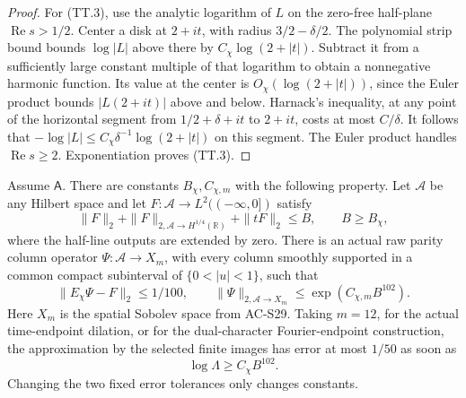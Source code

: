 \begin{proof}
For (TT.3), use the analytic logarithm of \(L\) on the
zero-free half-plane \(\operatorname{Re}s>1/2\).
Center a disk at \(2+it\), with radius
\(3/2-\delta/2\).
The polynomial strip bound bounds \(\log|L|\) above
there by \(C_\chi\log(2+|t|)\).
Subtract it from a sufficiently large constant multiple
of that logarithm to obtain a nonnegative harmonic
function.  Its value at the center is
\(O_\chi(\log(2+|t|))\), since the Euler product bounds
\(|L(2+it)|\) above and below.
Harnack's inequality, at any point of the horizontal
segment from \(1/2+\delta+it\) to \(2+it\), costs at
most \(C/\delta\).
It follows that
\(-\log|L|\leq C_\chi\delta^{-1}\log(2+|t|)\)
on this segment.  The Euler product handles
\(\operatorname{Re}s\geq2\).
Exponentiation proves (TT.3).
\end{proof}

\begin{lemma}
\label{AC-T41-halfline}
Assume \(\mathsf A\).
There are constants \(B_\chi,C_{\chi,m}\) with the following
property.  Let \(\mathcal A\) be any Hilbert space and let
\(F:\mathcal A\to L^2((-\infty,0])\) satisfy
\[
 \|F\|_2+\|F\|_{2,\mathcal A\to H^{1/4}(\mathbb R)}
             +\|tF\|_2\leq B,\qquad B\geq B_\chi ,
 \tag{TT.7}
\]
where the half-line outputs are extended by zero.
There is an actual raw parity column operator
\(\Psi:\mathcal A\to X_m\), with every column smoothly
supported in a common compact subinterval of
\(\{0<|u|<1\}\), such that
\[
 \|E_\chi\Psi-F\|_2\leq1/100,\qquad
 \|\Psi\|_{2,\mathcal A\to X_m}
                      \leq \exp(C_{\chi,m}B^{102}).
 \tag{TT.8}
\]
Here \(X_m\) is the spatial Sobolev space from AC-S29.
Taking \(m=12\), for the actual time-endpoint dilation, or
for the dual-character Fourier-endpoint construction,
the approximation by the selected finite images has error
at most \(1/50\) as soon as
\[
                    \log\Lambda\geq C_{\chi}B^{102}.
 \tag{TT.9}
\]
Changing the two fixed error tolerances only changes constants.
\end{lemma}

